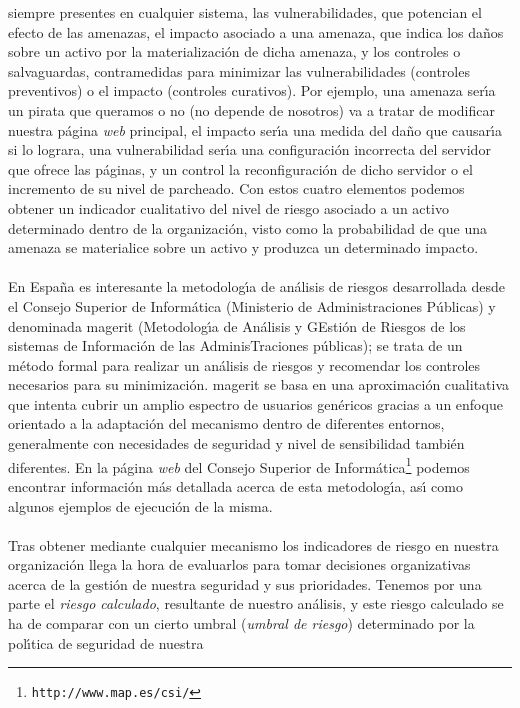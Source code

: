 siempre presentes en cualquier sistema, las vulnerabilidades, que potencian el
efecto de las amenazas, el impacto asociado a una amenaza, que indica los 
da\~nos sobre un activo por la materializaci\'on de dicha amenaza, y los 
controles o salvaguardas, contramedidas para minimizar las vulnerabilidades 
(controles preventivos) o el impacto (controles curativos). Por ejemplo, una 
amenaza ser\'{\i}a un pirata que queramos o no (no depende de nosotros) va a 
tratar de modificar nuestra p\'agina {\it web} principal, el impacto ser\'{\i}a
una medida del da\~no que causar\'{\i}a si lo lograra, una vulnerabilidad
ser\'{\i}a una configuraci\'on incorrecta del servidor que ofrece las p\'aginas,
y un control la reconfiguraci\'on de dicho servidor o el incremento de su
nivel de parcheado. Con estos cuatro elementos podemos obtener un indicador 
cualitativo del nivel de riesgo asociado a un activo determinado dentro de la 
organizaci\'on, visto como la probabilidad de que una amenaza se materialice
sobre un activo y produzca un determinado impacto.\\
\\En Espa\~na es interesante la metodolog\'{\i}a de an\'alisis de riesgos
desarrollada desde el Consejo Superior de Inform\'atica (Ministerio de
Administraciones P\'ublicas) y denominada {\sc magerit} (Metodolog\'{\i}a de
An\'alisis y GEsti\'on de Riesgos de los sistemas de Informaci\'on de las
AdminisTraciones p\'ublicas); se trata de un m\'etodo formal para realizar un
an\'alisis de riesgos y recomendar los controles necesarios para su
minimizaci\'on. {\sc magerit} se basa en una aproximaci\'on cualitativa que
intenta cubrir un amplio espectro de usuarios gen\'ericos gracias a un enfoque
orientado a la adaptaci\'on del mecanismo dentro de diferentes entornos,
generalmente con necesidades de seguridad y nivel de sensibilidad tambi\'en
diferentes. En la p\'agina {\it web} del Consejo Superior de
Inform\'atica\footnote{\tt http://www.map.es/csi/} podemos encontrar
informaci\'on m\'as detallada acerca de esta metodolog\'{\i}a, as\'{\i} como
algunos ejemplos de ejecuci\'on de la misma.\\
\\Tras obtener mediante cualquier mecanismo los indicadores de riesgo en nuestra
organizaci\'on llega la hora de evaluarlos para tomar decisiones organizativas
acerca de la gesti\'on de nuestra seguridad y sus prioridades. Tenemos por una
parte el {\it riesgo calculado}, resultante de nuestro an\'alisis, y este 
riesgo calculado se ha de comparar con un cierto umbral ({\it umbral de 
riesgo}) determinado por la pol\'{\i}tica de seguridad de nuestra 
